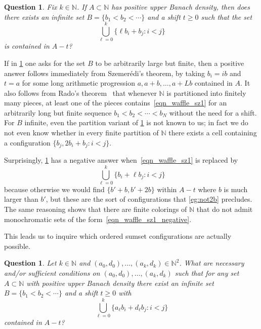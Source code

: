 \documentclass[10pt,dvipsnames]{article}
\newtheorem{question}[theorem]{Question}
\theoremstyle{definition}
\theoremstyle{plain}
\newcommand{\N}{\mathbb{N}}
\newcommand{\Szemeredi}{Szemer\'{e}di}
\begin{document}
\begin{question}
\label{q_sz_waffle_sum}
Fix $k \in \N$.
If $A\subset\N$ has positive upper Banach density, then does there exists an infinite set $B=\{b_1< b_2<\cdots\}$ and a shift $t\geq 0$ such that the set
\begin{equation}
\label{eqn_waffle_sz1}
\bigcup_{\ell=0}^k \{ \ell b_i+ b_j: i < j \} 
\end{equation}
is contained in $A-t$?
\end{question}

If in \cref{q_sz_waffle_sum} one asks for the set $B$ to be arbitrarily large but finite, then a positive answer follows immediately from \Szemeredi{}'s theorem, by taking $b_i=ib$ and $t=a$ for some long arithmetic progression $a,a+b,\dots,a+Lb$ contained in $A$.
It also follows from Rado's theorem~\cite{Rado33} that whenever $\N$ is partitioned into finitely many pieces, at least one of the pieces contains~\eqref{eqn_waffle_sz1}
for an arbitrarily long but finite sequence $b_1<b_2<\cdots<b_N$ without the need for a shift. 
For $B$ infinite, even the partition variant of \cref{q_sz_waffle_sum} is not known to us; in fact we do not even know whether in every finite partition of $\N$ there exists a cell containing a configuration $\{b_j,2b_i+b_j:i<j\}$.

Surprisingly,  \cref{q_sz_waffle_sum} has a negative answer when~\eqref{eqn_waffle_sz1} is replaced by
\begin{equation}
\label{eqn_waffle_sz1_negative}
\bigcup_{\ell = 0}^k \{ b_i + \ell b_j : i < j \} 
\end{equation}
because otherwise we would find $\{ b' + b, b'+2b \}$ within $A-t$ where $b$ is much larger than $b'$, but these are the sort of configurations that \cref{eg:not2b} precludes.
The same reasoning shows that there are finite colorings of $\N$ that do not admit monochromatic sets of the form~\eqref{eqn_waffle_sz1_negative}.

This leads us to inquire which ordered  sumset configurations are actually possible.



\begin{question}
\label{q:affine_images_of_sumsets}
Let $k\in\N$ and $(a_0,d_0),\ldots,(a_k,d_k) \in \N^2$.
What are necessary and/or sufficient conditions on $(a_0,d_0),\ldots,(a_k,d_k)$ such that for any set $A\subset\N$ with positive upper Banach density there exist an infinite set $B =\{b_1< b_2<\cdots\}$ and a shift $t\geq 0$ with
\[
\bigcup_{\ell=0}^k \{ a_\ell b_i + d_\ell b_j : i < j \}
\]
contained in $A-t$?
\end{question}
\end{document}
